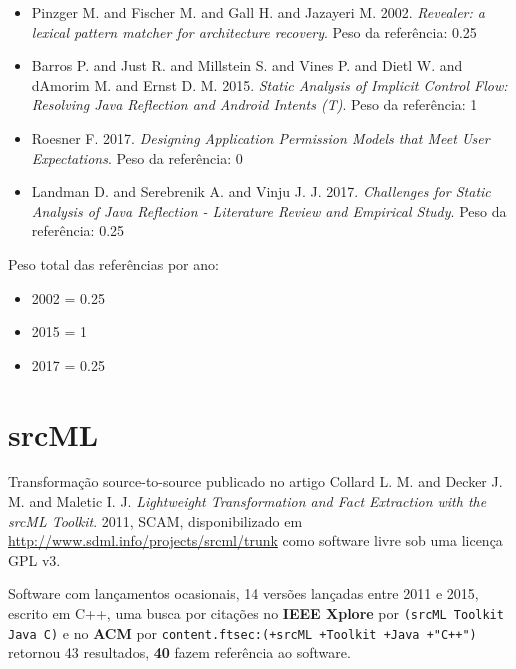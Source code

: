 \begin{itemize}
\item Pinzger M. and Fischer M. and Gall H. and Jazayeri M.
      2002.
      {\it Revealer: a lexical pattern matcher for architecture recovery}.
      Peso da referência: 0.25
\item Barros P. and Just R. and Millstein S. and Vines P. and Dietl W. and dAmorim M. and Ernst D. M.
      2015.
      {\it Static Analysis of Implicit Control Flow: Resolving Java Reflection and Android Intents (T)}.
      Peso da referência: 1
\item Roesner F.
      2017.
      {\it Designing Application Permission Models that Meet User Expectations}.
      Peso da referência: 0
\item Landman D. and Serebrenik A. and Vinju J. J.
      2017.
      {\it Challenges for Static Analysis of Java Reflection - Literature Review and Empirical Study}.
      Peso da referência: 0.25
\end{itemize}

Peso total das referências por ano:

\begin{itemize}
\item 2002 = 0.25
\item 2015 = 1
\item 2017 = 0.25
\end{itemize}


\section{srcML}

Transformação source-to-source
publicado no artigo
Collard L. M. and Decker J. M. and Maletic I. J.
{\it Lightweight Transformation and Fact Extraction with the srcML Toolkit}.
2011,
SCAM,
disponibilizado em \url{http://www.sdml.info/projects/srcml/trunk}
como software livre
sob uma licença GPL v3.

Software com lançamentos ocasionais,
14 versões lançadas
entre 2011 e 2015,
escrito em C++,
uma busca por citações no {\bf IEEE Xplore} por
\texttt{(srcML Toolkit Java C)}
e no {\bf ACM} por
\texttt{content.ftsec:(+srcML +Toolkit +Java +"C++")}
retornou
43 resultados,
{\bf 40} fazem referência ao software.

